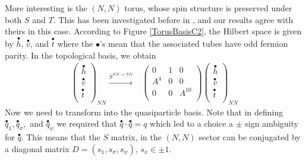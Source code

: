 \documentclass[12pt,a4paper]{article}
\newcounter{arrow}
\newcommand{\unit}{\mathds{1}}
\begin{document}
More interesting is the $(N,N)$ torus, whose spin structure is preserved under both $S$ and $T$. 
This has been investigated before in \cite{ware2016}, and our results agree with theirs in this case. 
According to Figure \ref{TorusBasisC2}, the Hilbert space is given by $\overset{\bullet}{h}$, $\overset{\bullet}{v}$, and $\overset{\bullet}{t}$
where the $\bullet$'s mean that the associated tubes have odd fermion parity.
In the topological basis, we obtain
\begin{align}
\left( \begin{matrix}
\overset{\bullet}{h}\\
\overset{\bullet}{v}\\
\overset{\bullet}{t}\\
\end{matrix} \right)_{NN} 
\xrightarrow{S^{NN \rightarrow NN}} & \left( \begin{matrix}
0&1&0\\
 A^4&0&0\\
0&0&A^{10}\\
\end{matrix} \right)
\left( \begin{matrix}
\overset{\bullet}{h}\\
\overset{\bullet}{v}\\
\overset{\bullet}{t}\\
\end{matrix} \right)_{NN}
\end{align}
Now we need to transform into the quasiparticle basis. 
Note that in defining $\overset{\bullet}{q}_\unit, \overset{\bullet}{q}_\sigma,$ 
and $\overset{\bullet}{q}_\psi$ we required that $ \overset{\bullet}{q} \cdot \overset{\bullet}{q} = q$ which 
led to a choice a $\pm$ sign ambiguity for $\overset{\bullet}{q}$. 
This means that the $S$ matrix, in the $(N,N)$ sector can be conjugated by a diagonal matrix $D = (s_\unit, s_\sigma, s_\psi)$, $s_x \in \pm 1$.
\end{document}
